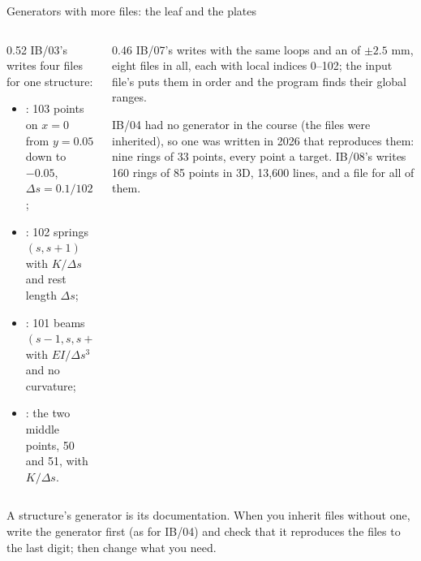 \documentclass[aspectratio=169,11pt]{beamer}
\begin{document}
\begin{frame}{Generators with more files: the leaf and the plates}
\begin{columns}[T,onlytextwidth]
\begin{column}{0.52\textwidth}
\small IB/03's  writes four files for one structure:
\begin{itemize}
  \item {}: 103 points on $x = 0$ from $y = 0.05$ down to $-0.05$, $\Delta s = 0.1/102$;
  \item {}: 102 springs $(s, s+1)$ with $K/\Delta s$ and rest length $\Delta s$;
  \item {}: 101 beams $(s-1, s, s+1)$ with $EI/\Delta s^3$ and no curvature;
  \item {}: the two middle points, 50 and 51, with $K/\Delta s$.
\end{itemize}
\end{column}
\begin{column}{0.46\textwidth}
\small IB/07's writes  with the same loops and an  of $\pm 2.5$ mm, eight files in all, each with local indices 0--102; the input file's  puts them in order and the program finds their global ranges.
\vspace{1mm}

IB/04 had no generator in the course (the files were inherited), so one was written in 2026 that reproduces them: nine rings of 33 points, every point a target. IB/08's  writes 160 rings of 85 points in 3D, 13,600 lines, and a  file for all of them.
\end{column}
\end{columns}
\vspace{1mm}
\begin{punchbox}
\small A structure's generator is its documentation. When you inherit files without one, write the generator first (as for IB/04) and check that it reproduces the files to the last digit; then change what you need.
\end{punchbox}
\end{frame}
\end{document}
